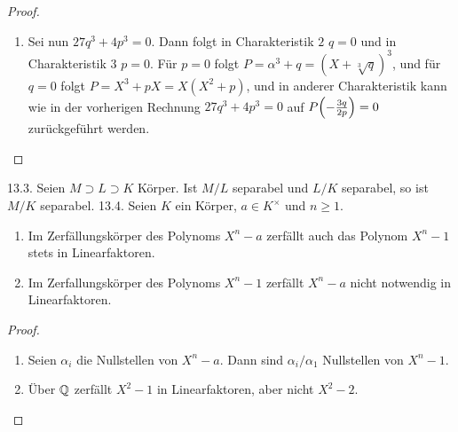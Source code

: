 \documentclass{article}
\newcommand{\ex}[1]{\tit{Übung} #1.}
\begin{document}
\begin{proof}
\begin{enumerate}
\begin{enumerate}
\begin{enumerate}
\begin{align*}
					\end{align*}
					Setzen wir dies in $P$ ein, erhalten wir:
					\begin{align*}
						\lr(-\frac{3q}{2p})^3 + \lr(-\frac{3q}{2p}) + q &= 0\\
					\Leftrightarrow -\frac{27q^3}{8p^3} -\frac{3q}{2p} + q &= 0\\
					\Leftrightarrow -27q^3 - 12qp^3 + 8qp^3 &= 0\\
					\Leftrightarrow 27q^3 + 4p^3 &= 0
					\end{align*}
				\end{enumerate}
			\end{enumerate} 
			\item Sei nun $27q^3 + 4p^3 = 0$. Dann folgt in Charakteristik $2$ $q = 0$ und in Charakteristik $3$ $p = 0$. Für $p = 0$ folgt $P = \alpha^3 + q = (X + \sqrt[3]{q})^3$, und für $q = 0$ folgt $P = X^3 + pX = X (X^2 + p)$, und in anderer Charakteristik kann wie in der vorherigen Rechnung $27q^3 + 4p^3 = 0$ auf $P\qty(-\frac{3q}{2p}) = 0$ zurückgeführt werden.
			\end{enumerate}
		\end{proof}
		\newpar
		\ex{13.3} Seien $M \supset L \supset K$ Körper. Ist $M/L$ separabel und $L/K$ separabel, so ist $M/K$ separabel.
		\newpar
		\ex{13.4} Seien $K$ ein Körper, $a \in K^\times$ und $n \geq 1$.
		\begin{enumerate}
			\item Im Zerfällungskörper des Polynoms $X^n - a$ zerfällt auch das Polynom $X^n - 1$ stets in Linearfaktoren.
			\item Im Zerfallungskörper des Polynoms $X^n-1$ zerfällt $X^n-a$ nicht notwendig in Linearfaktoren.
		\end{enumerate}
		\begin{proof}
		\begin{enumerate}
			\item Seien $\alpha_i$ die Nullstellen von $X^n - a$. Dann sind $\alpha_i/\alpha_1$ Nullstellen von $X^n - 1$.
			\item Über $\mathbb{Q}$ zerfällt $X^2 - 1$ in Linearfaktoren, aber nicht $X^2 - 2$.
		\end{enumerate}
		\end{proof}
	\clearpage
\end{document}
